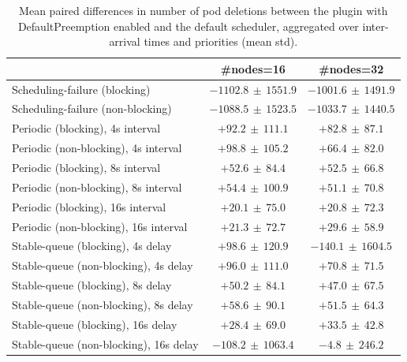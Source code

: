 \begin{table}[t]
\tiny
\setlength{\tabcolsep}{1.2pt}
\renewcommand{\arraystretch}{1.12}
\centering
\caption{Mean paired differences in number of pod deletions between the plugin with DefaultPreemption enabled and the default scheduler, aggregated over inter-arrival times and priorities (mean \pm std).}
\label{tab:deletions-defpreempt1-std1-agg-arrival-prio}
\begin{tabular}{l c c}
\toprule
 & \#nodes=16 & \#nodes=32 \\
\midrule
Scheduling-failure (blocking) & $-1102.8\,\pm\,1551.9$ & $-1001.6\,\pm\,1491.9$ \\
Scheduling-failure (non-blocking) & $-1088.5\,\pm\,1523.5$ & $-1033.7\,\pm\,1440.5$ \\
Periodic (blocking), 4s interval & $+92.2\,\pm\,111.1$ & $+82.8\,\pm\,87.1$ \\
Periodic (non-blocking), 4s interval & $+98.8\,\pm\,105.2$ & $+66.4\,\pm\,82.0$ \\
Periodic (blocking), 8s interval & $+52.6\,\pm\,84.4$ & $+52.5\,\pm\,66.8$ \\
Periodic (non-blocking), 8s interval & $+54.4\,\pm\,100.9$ & $+51.1\,\pm\,70.8$ \\
Periodic (blocking), 16s interval & $+20.1\,\pm\,75.0$ & $+20.8\,\pm\,72.3$ \\
Periodic (non-blocking), 16s interval & $+21.3\,\pm\,72.7$ & $+29.6\,\pm\,58.9$ \\
Stable-queue (blocking), 4s delay & $+98.6\,\pm\,120.9$ & $-140.1\,\pm\,1604.5$ \\
Stable-queue (non-blocking), 4s delay & $+96.0\,\pm\,111.0$ & $+70.8\,\pm\,71.5$ \\
Stable-queue (blocking), 8s delay & $+50.2\,\pm\,84.1$ & $+47.0\,\pm\,67.5$ \\
Stable-queue (non-blocking), 8s delay & $+58.6\,\pm\,90.1$ & $+51.5\,\pm\,64.3$ \\
Stable-queue (blocking), 16s delay & $+28.4\,\pm\,69.0$ & $+33.5\,\pm\,42.8$ \\
Stable-queue (non-blocking), 16s delay & $-108.2\,\pm\,1063.4$ & $-4.8\,\pm\,246.2$ \\
\bottomrule
\end{tabular}
\end{table}
